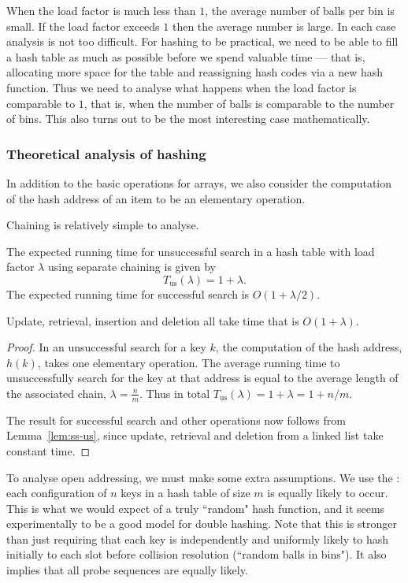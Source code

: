 When the load factor is much less than $1$, the average number of balls per bin
is small. If the load factor exceeds $1$ then the average number is large. In 
each case analysis is not too difficult. For hashing to be practical, we need 
to be able to fill a hash table as much as possible before we spend valuable 
time  --- that is, allocating more space for the table
 and reassigning hash codes via a new hash function. Thus we need to analyse 
 what happens when the load factor is comparable to $1$, that is, when the 
 number of balls is comparable to the number of bins. This also turns out to be
 the most interesting case mathematically.

\subsubsection{Theoretical analysis of hashing}

In addition to the basic operations for arrays, we also 
consider the computation of the hash address of an item to be an elementary 
operation.

Chaining is relatively simple to analyse. 

\begin{Lemma}\label{lem:sc}
The expected running time for unsuccessful search
in a hash table with load factor \(\lambda\) using
separate chaining is given by 
$$T_{\mathrm{us}}(\lambda)= 1+\lambda. $$
The expected running time for successful search is $O(1 + \lambda/2)$.

Update, retrieval, insertion and deletion all take time that is $O(1+\lambda)$.
\end{Lemma}
\begin{proof}
In an unsuccessful search for a key \(k\), the computation of
the hash address, \(h(k)\), takes one elementary
operation. The average running time to unsuccessfully search for the
key at that address is equal to the average length of the
associated chain, \(\lambda=\frac{n}{m}\). Thus in total
$T_{\mathrm{us}}(\lambda) = 1 + \lambda = 1 + n/m$.

The result for successful search and other operations 
now follows from Lemma~\ref{lem:ss-us}, since update, retrieval and deletion from a 
linked list take constant time.
\end{proof}

To analyse open addressing, we must make some extra assumptions. We use the 
: each configuration of $n$ keys in a 
hash table of size $m$ is equally likely to occur. This is what we would expect 
of a truly ``random" hash function, and it seems experimentally 
to be a good model for double hashing. Note that this is stronger than just 
requiring that each key is independently and uniformly likely to hash initially 
to each slot before collision resolution (``random balls in bins").
It also implies that all probe sequences are equally likely.

